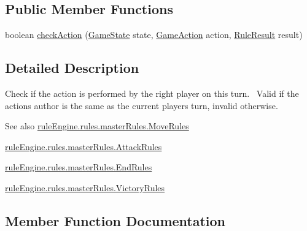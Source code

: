 \subsection*{Public Member Functions}
\begin{DoxyCompactItemize}
\item 
boolean \mbox{\hyperlink{classrule_engine_1_1rules_1_1atomic_rules_1_1_check_player_turn_a451c627cc11c06a071c96c7d784836ec}{check\+Action}} (\mbox{\hyperlink{classgame_1_1game_state_1_1_game_state}{Game\+State}} state, \mbox{\hyperlink{classrule_engine_1_1_game_action}{Game\+Action}} action, \mbox{\hyperlink{classrule_engine_1_1_rule_result}{Rule\+Result}} result)
\end{DoxyCompactItemize}


\subsection{Detailed Description}
Check if the action is performed by the right player on this turn.~\newline
 Valid if the action\textquotesingle{}s author is the same as the current player\textquotesingle{}s turn, invalid otherwise.

\begin{DoxySeeAlso}{See also}
\mbox{\hyperlink{classrule_engine_1_1rules_1_1master_rules_1_1_move_rules}{rule\+Engine.\+rules.\+master\+Rules.\+Move\+Rules}} 

\mbox{\hyperlink{classrule_engine_1_1rules_1_1master_rules_1_1_attack_rules}{rule\+Engine.\+rules.\+master\+Rules.\+Attack\+Rules}} 

\mbox{\hyperlink{classrule_engine_1_1rules_1_1master_rules_1_1_end_rules}{rule\+Engine.\+rules.\+master\+Rules.\+End\+Rules}} 

\mbox{\hyperlink{classrule_engine_1_1rules_1_1master_rules_1_1_victory_rules}{rule\+Engine.\+rules.\+master\+Rules.\+Victory\+Rules}} 
\end{DoxySeeAlso}


\subsection{Member Function Documentation}
\mbox{\label{classrule_engine_1_1rules_1_1atomic_rules_1_1_check_player_turn_a451c627cc11c06a071c96c7d784836ec}} 
